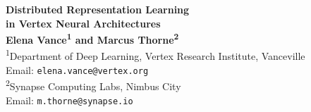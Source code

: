 \documentclass[11pt,letterpaper,twoside]{article}
\begin{document}
\begin{center}
    \vspace*{1.5cm}
    {\Huge\bfseries\color{primary} Distributed Representation Learning\\[0.3em] in Vertex Neural Architectures}\\[2em]
    
    {\large\bfseries Elena Vance\textsuperscript{1} and Marcus Thorne\textsuperscript{2}}\\[1.5em]
    
    \textsuperscript{1}Department of Deep Learning, Vertex Research Institute, Vanceville\\
    Email: \texttt{elena.vance@vertex.org}\\[0.5em]
    \textsuperscript{2}Synapse Computing Labs, Nimbus City\\
    Email: \texttt{m.thorne@synapse.io}\\[2.5em]
\end{center}



\vspace{1.5cm}








\end{document}
